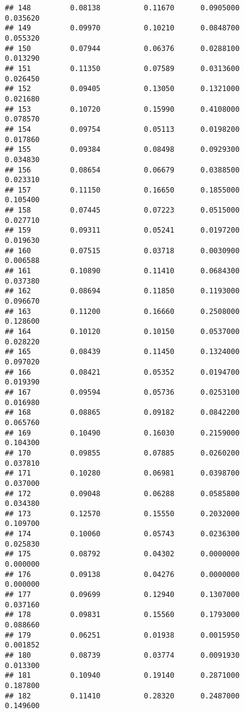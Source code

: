 \documentclass[
]{article}
\begin{document}
\begin{verbatim}
## 148         0.08138          0.11670      0.0905000            0.035620
## 149         0.09970          0.10210      0.0848700            0.055320
## 150         0.07944          0.06376      0.0288100            0.013290
## 151         0.11350          0.07589      0.0313600            0.026450
## 152         0.09405          0.13050      0.1321000            0.021680
## 153         0.10720          0.15990      0.4108000            0.078570
## 154         0.09754          0.05113      0.0198200            0.017860
## 155         0.09384          0.08498      0.0929300            0.034830
## 156         0.08654          0.06679      0.0388500            0.023310
## 157         0.11150          0.16650      0.1855000            0.105400
## 158         0.07445          0.07223      0.0515000            0.027710
## 159         0.09311          0.05241      0.0197200            0.019630
## 160         0.07515          0.03718      0.0030900            0.006588
## 161         0.10890          0.11410      0.0684300            0.037380
## 162         0.08694          0.11850      0.1193000            0.096670
## 163         0.11200          0.16660      0.2508000            0.128600
## 164         0.10120          0.10150      0.0537000            0.028220
## 165         0.08439          0.11450      0.1324000            0.097020
## 166         0.08421          0.05352      0.0194700            0.019390
## 167         0.09594          0.05736      0.0253100            0.016980
## 168         0.08865          0.09182      0.0842200            0.065760
## 169         0.10490          0.16030      0.2159000            0.104300
## 170         0.09855          0.07885      0.0260200            0.037810
## 171         0.10280          0.06981      0.0398700            0.037000
## 172         0.09048          0.06288      0.0585800            0.034380
## 173         0.12570          0.15550      0.2032000            0.109700
## 174         0.10060          0.05743      0.0236300            0.025830
## 175         0.08792          0.04302      0.0000000            0.000000
## 176         0.09138          0.04276      0.0000000            0.000000
## 177         0.09699          0.12940      0.1307000            0.037160
## 178         0.09831          0.15560      0.1793000            0.088660
## 179         0.06251          0.01938      0.0015950            0.001852
## 180         0.08739          0.03774      0.0091930            0.013300
## 181         0.10940          0.19140      0.2871000            0.187800
## 182         0.11410          0.28320      0.2487000            0.149600

\end{verbatim}
\end{document}
